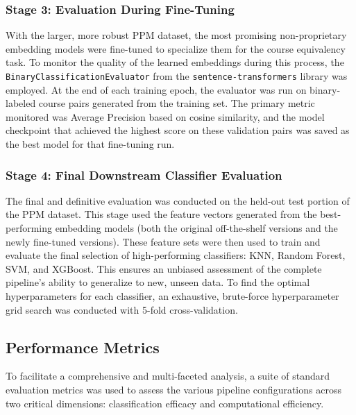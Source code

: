 \subsubsection{Stage 3: Evaluation During Fine-Tuning}\label{ch:3.4.1.2}
With the larger, more robust PPM dataset, the most promising non-proprietary embedding models were fine-tuned to specialize them for the course equivalency task. To monitor the quality of the learned embeddings during this process, the \verb|BinaryClassificationEvaluator| from the \verb|sentence-transformers| library was employed. At the end of each training epoch, the evaluator was run on binary-labeled course pairs generated from the training set. The primary metric monitored was Average Precision based on cosine similarity, and the model checkpoint that achieved the highest score on these validation pairs was saved as the best model for that fine-tuning run.{\setlength{\emergencystretch}{5em}\par}

\subsubsection{Stage 4: Final Downstream Classifier Evaluation}\label{ch:3.4.1.3}
The final and definitive evaluation was conducted on the held-out test portion of the PPM dataset. This stage used the feature vectors generated from the best-performing embedding models (both the original off-the-shelf versions and the newly fine-tuned versions). These feature sets were then used to train and evaluate the final selection of high-performing classifiers: KNN, Random Forest, SVM, and XGBoost. This ensures an unbiased assessment of the complete pipeline's ability to generalize to new, unseen data. To find the optimal hyperparameters for each classifier, an exhaustive, brute-force hyperparameter grid search was conducted with 5-fold cross-validation.

\subsection{Performance Metrics}\label{ch:3.4.2}
To facilitate a comprehensive and multi-faceted analysis, a suite of standard evaluation metrics was used to assess the various pipeline configurations across two critical dimensions: classification efficacy and computational efficiency.

